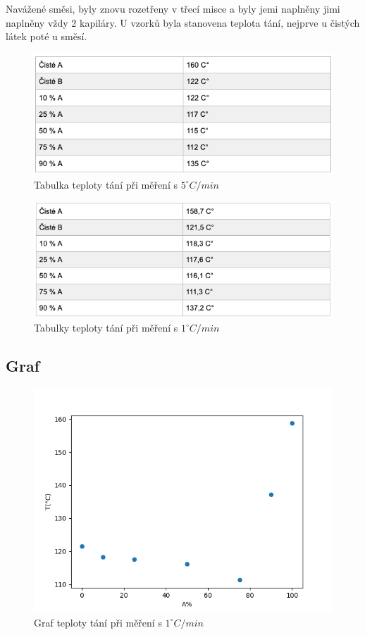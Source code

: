 \documentclass[13pt, a4paper, twoside]{article}
\begin{document}
\begin{enumerate}
Navážené směsi, byly znovu rozetřeny v třecí misce a byly jemi naplněny jimi naplněny vždy 2 kapiláry. U vzorků byla stanovena teplota tání, nejprve u čistých látek poté u směsí.

\begin{figure}[H]
    \centering
    \includegraphics[width=7in]{uloha_4_tab_2.png}
    \caption*{Tabulka teploty tání při měření s $5^{\circ}C/min$}
\end{figure}

\begin{figure}[H]
    \centering
    \includegraphics[width=7in]{uloha_4_tab_3.png}
    \caption*{Tabulky teploty tání při měření s $1^{\circ}C/min$}
\end{figure}

\subsection*{Graf}
\begin{figure}[H]
    \centering
    \includegraphics[width=5in]{teplota_tani_graf.png}
    \caption*{Graf teploty tání při měření s $1^{\circ}C/min$}
\end{figure}


\end{enumerate}
\end{document}

